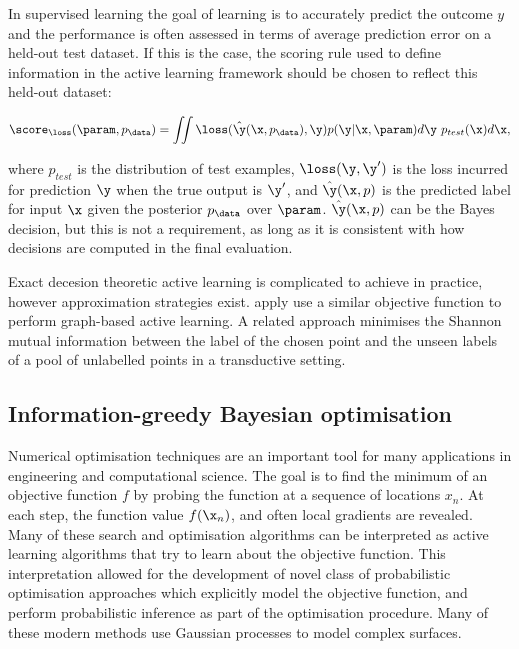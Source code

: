 In supervised learning the goal of learning is to accurately predict the outcome $y$ and the performance is often assessed in terms of average prediction error on a held-out test dataset. If this is the case, the scoring rule used to define information in the active learning framework should be chosen to reflect this held-out dataset:

\begin{equation}
	\score_{\loss}(\param,p_\data) = \iint \loss(\hat{\y}(\x,p_\data),\y) p(\y\vert\x,\param) d\y\ p_{test}(\x) d\x,
\end{equation}

where $p_{test}$ is the distribution of test examples, $\loss(\y,\y')$ is the loss incurred for prediction $\y$ when the true output is $\y'$, and $\hat{\y}(\x,p)$ is the predicted label for input $\x$ given the posterior $p_\data$ over $\param$. $\hat{\y}(\x,p)$ can be the Bayes decision, but this is not a requirement, as long as it is consistent with how decisions are computed in the final evaluation. 

Exact decesion theoretic active learning is complicated to achieve in practice, however approximation strategies exist. \citet{} apply \citet{ZhuGhahramani} use a similar objective function to perform graph-based active learning.
A related approach minimises the Shannon mutual information between the label of the chosen point and the unseen labels of a pool of unlabelled points in a transductive setting.

\subsection{Information-greedy Bayesian optimisation}

Numerical optimisation techniques are an important tool for many applications in engineering and computational science.
The goal is to find the minimum of an objective function $f$ by probing the function at a sequence of locations $x_n$. At each step, the function value $f(\x_n)$, and often local gradients are revealed. Many of these search and optimisation algorithms can be interpreted as active learning algorithms that try to learn about the objective function. This interpretation allowed for the development of novel class of probabilistic optimisation approaches which explicitly model the objective function, and perform probabilistic inference as part of the optimisation procedure. Many of these modern methods use Gaussian processes to model complex surfaces.


